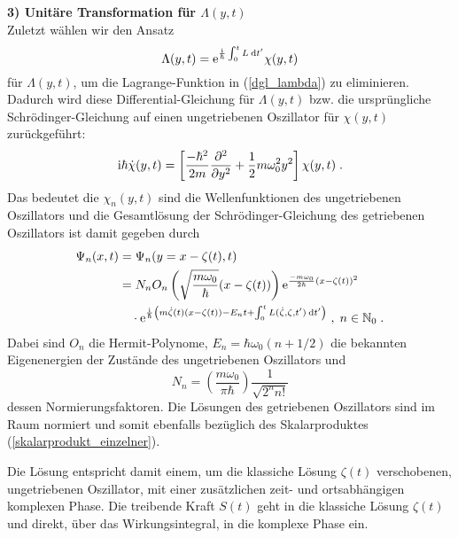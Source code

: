   \textbf{3) Unitäre Transformation für $\Lambda(y,t)$}\\
  Zuletzt wählen wir den Ansatz
  \begin{equation}
    \Lambda(y,t) = \text e^{\frac{\text i}{\hbar}\int_0^tL \: \text d t'}\chi(y,t)
  \end{equation}
  für $\Lambda(y,t)$, um die Lagrange-Funktion in (\ref{dgl_lambda}) zu eliminieren.
  Dadurch wird diese Differential-Gleichung für $\Lambda(y,t)$ bzw. die ursprüngliche Schrödinger-Gleichung auf einen ungetriebenen Oszillator für $\chi(y,t)$ zurückgeführt:
  \begin{equation}
    \text i \hbar \dot \chi(y,t) = \left[ \frac{-\hbar^2}{2m}\frac{\partial^2}{\partial y^2} + \frac{1}{2}m\omega_0^2y^2 \right]\chi(y,t) \; .
  \end{equation}
  Das bedeutet die $\chi_n(y,t)$ sind die Wellenfunktionen des ungetriebenen Oszillators und die Gesamtlösung der Schrödinger-Gleichung des getriebenen Oszillators ist damit gegeben durch
  \begin{align}
    \begin{split}
    \Psi_n(x,t) &= \Psi_n(y=x-\zeta(t),t) \\
    &= N_nO_n\left(\sqrt{\frac{m\omega_0}{\hbar}}(x-\zeta(t))\right) \text e^{\frac{-m\omega_0}{2\hbar}(x-\zeta(t))^2} \\
    &\quad \cdot \text e^{\frac{\text i}{\hbar}\left(m\dot \zeta(t)(x-\zeta(t))-E_nt+\int_0^tL(\dot \zeta,\zeta,t')\:\text dt'\right)} \; ,
    \; n \in \mathbb{N}_0 \; .
    \label{gesamtlsg_einzelner}
  \end{split}
  \end{align}
  Dabei sind $O_n$ die Hermit-Polynome, $E_n = \hbar \omega_0(n+1/2)$ die bekannten Eigenenergien der Zustände des ungetriebenen Oszillators und
  \begin{equation}
    N_n = \left(\frac{m\omega_0}{\pi \hbar}\right) \frac{1}{\sqrt{2^nn!}}
  \end{equation}
  dessen Normierungsfaktoren.
  Die Lösungen des getriebenen Oszillators sind im Raum normiert und somit ebenfalls bezüglich des Skalarproduktes (\ref{skalarprodukt_einzelner}).

  Die Lösung entspricht damit einem, um die klassiche Lösung $\zeta(t)$ verschobenen, ungetriebenen Oszillator, mit einer zusätzlichen zeit- und ortsabhängigen komplexen Phase.
  Die treibende Kraft $S(t)$ geht in die klassiche Lösung $\zeta(t)$ und direkt, über das Wirkungsintegral, in die komplexe Phase ein.



